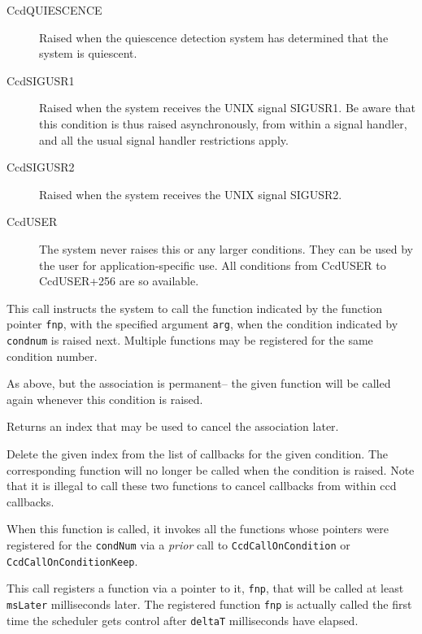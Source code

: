 \begin{description}
\item[CcdQUIESCENCE] Raised when the quiescence detection system
has determined that the system is quiescent.
\item[CcdSIGUSR1] Raised when the system receives the UNIX signal SIGUSR1.
Be aware that this condition is thus raised asynchronously, from
within a signal handler, and all the usual signal handler restrictions apply.
\item[CcdSIGUSR2] Raised when the system receives the UNIX signal SIGUSR2.
\item[CcdUSER] The system never raises this or any larger conditions.
They can be used by the user for application-specific use.  All conditions
from CcdUSER to CcdUSER+256 are so available.
\end{description}


This call instructs the system to call the function indicated by the
function pointer {\tt fnp}, with the specified argument {\tt arg}, when the
condition indicated by {\tt condnum} is raised next. Multiple functions may
be registered for the same condition number.

As above, but the association is permanent-- the given function will
be called again whenever this condition is raised.

Returns an index that may be used to cancel the association later.

Delete the given index from the list of callbacks for
the given condition. The corresponding function will no longer be 
called when the condition is raised.
Note that it is illegal to call these two functions to cancel callbacks from within ccd callbacks.


When this function is called, it invokes all the functions whose
pointers were registered for the \verb#condNum# via a {\em prior} call
to {\tt CcdCallOnCondition} or {\tt CcdCallOnConditionKeep}.  


This call registers a function via a pointer to it, {\tt fnp},  that will be
called at least {\tt msLater} milliseconds later. 
The registered function {\tt fnp} is actually called the first time the
scheduler gets control after {\tt deltaT} milliseconds have elapsed. 

